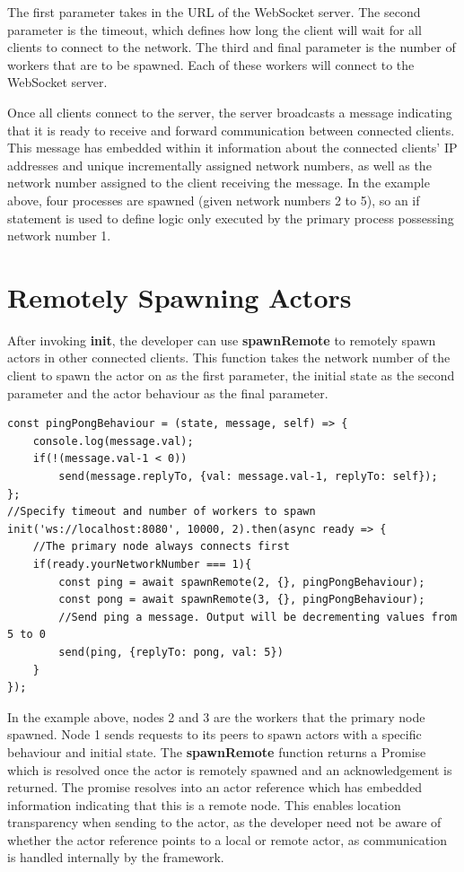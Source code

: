 \documentclass[12pt, a4paper]{report}
\theoremstyle{definition}
\theoremstyle{definition}%
\theoremstyle{definition}%
\theoremstyle{definition}%
\theoremstyle{definition}%
\theoremstyle{definition}%
\begin{document}
The first parameter takes in the URL of the WebSocket server. The second parameter is the timeout, which defines how long the client will wait for all clients to connect to the network. The third and final parameter is the number of workers that are to be spawned. Each of these workers will connect to the WebSocket server.

Once all clients connect to the server, the server broadcasts a message indicating that it is ready to receive and forward communication between connected clients. This message has embedded within it information about the connected clients' IP addresses and unique incrementally assigned network numbers, as well as the network number assigned to the client receiving the message. In the example above, four processes are spawned (given network numbers 2 to 5), so an if statement is used to define logic only executed by the primary process possessing network number 1.

\section{Remotely Spawning Actors}
After invoking \textbf{init}, the developer can use \textbf{spawnRemote} to remotely spawn actors in other connected clients. This function takes the network number of the client to spawn the actor on as the first parameter, the initial state as the second parameter and the actor behaviour as the final parameter.
\newpage
\begin{lstlisting}
const pingPongBehaviour = (state, message, self) => {
    console.log(message.val);
    if(!(message.val-1 < 0))
        send(message.replyTo, {val: message.val-1, replyTo: self});
};
//Specify timeout and number of workers to spawn
init('ws://localhost:8080', 10000, 2).then(async ready => {
    //The primary node always connects first
    if(ready.yourNetworkNumber === 1){
        const ping = await spawnRemote(2, {}, pingPongBehaviour);
        const pong = await spawnRemote(3, {}, pingPongBehaviour);
        //Send ping a message. Output will be decrementing values from 5 to 0
        send(ping, {replyTo: pong, val: 5})
    }
});
\end{lstlisting}
In the example above, nodes 2 and 3 are the workers that the primary node spawned. Node 1 sends requests to its peers to spawn actors with a specific behaviour and initial state. The \textbf{spawnRemote} function returns a Promise which is resolved once the actor is remotely spawned and an acknowledgement is returned. The promise resolves into an actor reference which has embedded information indicating that this is a remote node. This enables location transparency when sending to the actor, as the developer need not be aware of whether the actor reference points to a local or remote actor, as communication is handled internally by the framework.


\bibliomatter
\raggedright


 
\end{document}
